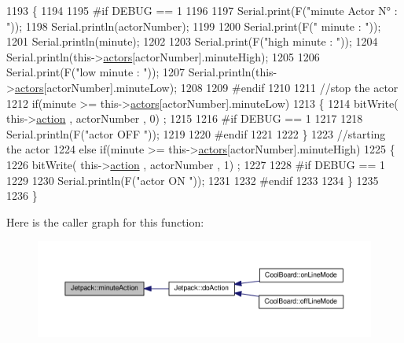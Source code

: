 \begin{DoxyCode}
1193 \{
1194 
1195 \textcolor{preprocessor}{#if DEBUG == 1}
1196     
1197     Serial.print(F(\textcolor{stringliteral}{"minute Actor N° : "}));
1198     Serial.println(actorNumber);
1199 
1200     Serial.print(F(\textcolor{stringliteral}{" minute : "}));
1201     Serial.println(minute);
1202 
1203     Serial.print(F(\textcolor{stringliteral}{"high minute : "}));
1204     Serial.println(this->\hyperlink{class_jetpack_a7e16d2f97837f9712a2e6de1c50d99db}{actors}[actorNumber].minuteHigh);
1205 
1206     Serial.print(F(\textcolor{stringliteral}{"low minute : "}));
1207     Serial.println(this->\hyperlink{class_jetpack_a7e16d2f97837f9712a2e6de1c50d99db}{actors}[actorNumber].minuteLow);
1208 
1209 \textcolor{preprocessor}{#endif}
1210 
1211     \textcolor{comment}{//stop the actor    }
1212     \textcolor{keywordflow}{if}(minute >= this->\hyperlink{class_jetpack_a7e16d2f97837f9712a2e6de1c50d99db}{actors}[actorNumber].minuteLow)
1213     \{
1214         bitWrite( this->\hyperlink{class_jetpack_aca3142925a7b0834b34ae91d26af7765}{action} , actorNumber , 0) ;
1215 
1216 \textcolor{preprocessor}{    #if DEBUG == 1 }
1217 
1218         Serial.println(F(\textcolor{stringliteral}{"actor OFF "}));
1219 
1220 \textcolor{preprocessor}{    #endif  }
1221 
1222     \}   
1223     \textcolor{comment}{//starting the actor}
1224     \textcolor{keywordflow}{else} \textcolor{keywordflow}{if}(minute >= this->\hyperlink{class_jetpack_a7e16d2f97837f9712a2e6de1c50d99db}{actors}[actorNumber].minuteHigh)
1225     \{
1226         bitWrite( this->\hyperlink{class_jetpack_aca3142925a7b0834b34ae91d26af7765}{action} , actorNumber , 1) ;
1227 
1228 \textcolor{preprocessor}{    #if DEBUG == 1 }
1229 
1230         Serial.println(F(\textcolor{stringliteral}{"actor ON "}));
1231 
1232 \textcolor{preprocessor}{    #endif  }
1233 
1234     \}
1235 
1236 \} 
\end{DoxyCode}
Here is the caller graph for this function\+:
\nopagebreak
\begin{figure}[H]
\begin{center}
\leavevmode
\includegraphics[width=350pt]{df/d1d/class_jetpack_a97da41141c7b53ddee61143519c8d17d_icgraph}
\end{center}
\end{figure}
\mbox{\label{class_jetpack_ac1a49ab4867718cdb415ad74c2066b9d}} 
